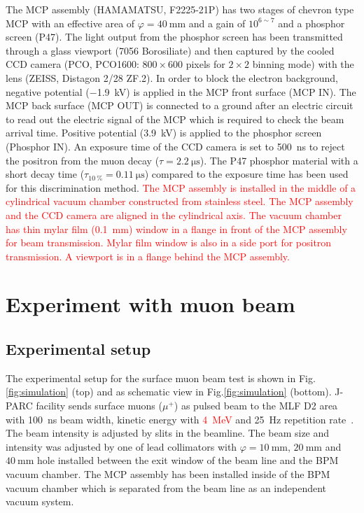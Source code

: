 \documentclass[preprint,3p,twocolumn]{elsarticle}
\begin{document}
The MCP assembly (HAMAMATSU, F2225-21P) has two stages of chevron type MCP with an effective area of $\varphi = \SI{40}{\mm}$ and a gain of $10^{6\sim7}$ and a phosphor screen (P47). The light output from the phosphor screen has been transmitted through a glass viewport (7056 Borosiliate) and then captured by the cooled CCD camera (PCO, PCO1600: $800 \times 600$ pixels for $2 \times 2$ binning mode) with the lens (ZEISS, Distagon 2/28 ZF.2). 
In order to block the electron background, negative potential (\SI{-1.9}{\kilo\volt}) is applied in the MCP front surface (MCP IN).
The MCP back surface (MCP OUT) is connected to a ground after an electric circuit to read out the electric signal of the MCP which is required to check the beam arrival time.
Positive potential (\SI{3.9}{\kilo\volt}) is applied to the phosphor screen (Phosphor IN).
An exposure time of the CCD camera is set to \SI{500}{\nano\s} to reject the positron from the muon decay ($\tau = \SI{2.2}{\micro\s}$).
The P47 phosphor material with a short decay time ($\tau_{\SI{10}{\percent}} = \SI{0.11}{\micro\s}$) compared to the exposure time has been used for this discrimination method.
\textcolor{red}{The MCP assembly is installed in the middle of a cylindrical vacuum chamber constructed from stainless steel.
The MCP assembly and the CCD camera are aligned in the cylindrical axis.
The vacuum chamber has thin mylar film (\SI{0.1}{mm}) window in a flange in front of the MCP assembly for beam transmission.
Mylar film window is also in a side port for positron transmission. 
A viewport is in a flange behind the MCP assembly.}

\section{Experiment with muon beam}

\subsection{Experimental setup} 

The experimental setup for the surface muon beam test is shown in Fig.\ref{fig:simulation} {(top)} and as schematic view in Fig.\ref{fig:simulation} {(bottom)}.
J-PARC facility sends surface muons ($\mu^{+}$) as pulsed beam to the MLF D2 area with \SI{100}{\nano\s} beam width, kinetic energy with \textcolor{red}{\SI{4}{\MeV}} and \SI{25}{\hertz} repetition rate~\cite{D-line, D-line1}.
The beam intensity is adjusted by slits in the beamline.
The beam size and intensity was adjusted by one of lead collimators with $\varphi=\SI{10}{\mm}$, $\SI{20}{\mm}$ and $\SI{40}{\mm}$ hole installed between the exit window of the beam line and the BPM vacuum chamber.
The MCP assembly has been installed inside of the BPM vacuum chamber which is separated from the beam line as an independent vacuum system.
\end{document}
